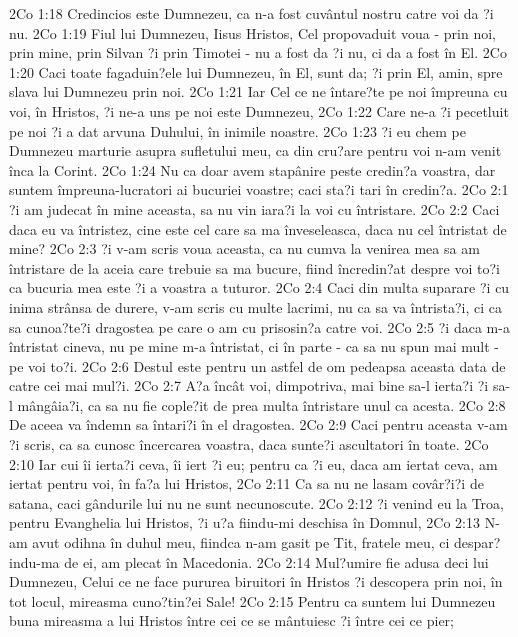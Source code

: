 2Co 1:18  Credincios este Dumnezeu, ca n-a fost cuvântul nostru catre voi da ?i nu.
2Co 1:19  Fiul lui Dumnezeu, Iisus Hristos, Cel propovaduit voua - prin noi, prin mine, prin Silvan ?i prin Timotei - nu a fost da ?i nu, ci da a fost în El.
2Co 1:20  Caci toate fagaduin?ele lui Dumnezeu, în El, sunt da; ?i prin El, amin, spre slava lui Dumnezeu prin noi.
2Co 1:21  Iar Cel ce ne întare?te pe noi împreuna cu voi, în Hristos, ?i ne-a uns pe noi este Dumnezeu,
2Co 1:22  Care ne-a ?i pecetluit pe noi ?i a dat arvuna Duhului, în inimile noastre.
2Co 1:23  ?i eu chem pe Dumnezeu marturie asupra sufletului meu, ca din cru?are pentru voi n-am venit înca la Corint.
2Co 1:24  Nu ca doar avem stapânire peste credin?a voastra, dar suntem împreuna-lucratori ai bucuriei voastre; caci sta?i tari în credin?a.
2Co 2:1  ?i am judecat în mine aceasta, sa nu vin iara?i la voi cu întristare.
2Co 2:2  Caci daca eu va întristez, cine este cel care sa ma înveseleasca, daca nu cel întristat de mine?
2Co 2:3  ?i v-am scris voua aceasta, ca nu cumva la venirea mea sa am întristare de la aceia care trebuie sa ma bucure, fiind încredin?at despre voi to?i ca bucuria mea este ?i a voastra a tuturor.
2Co 2:4  Caci din multa suparare ?i cu inima strânsa de durere, v-am scris cu multe lacrimi, nu ca sa va întrista?i, ci ca sa cunoa?te?i dragostea pe care o am cu prisosin?a catre voi.
2Co 2:5  ?i daca m-a întristat cineva, nu pe mine m-a întristat, ci în parte - ca sa nu spun mai mult - pe voi to?i.
2Co 2:6  Destul este pentru un astfel de om pedeapsa aceasta data de catre cei mai mul?i.
2Co 2:7  A?a încât voi, dimpotriva, mai bine sa-l ierta?i ?i sa-l mângâia?i, ca sa nu fie cople?it de prea multa întristare unul ca acesta.
2Co 2:8  De aceea va îndemn sa întari?i în el dragostea.
2Co 2:9  Caci pentru aceasta v-am ?i scris, ca sa cunosc încercarea voastra, daca sunte?i ascultatori în toate.
2Co 2:10  Iar cui îi ierta?i ceva, îi iert ?i eu; pentru ca ?i eu, daca am iertat ceva, am iertat pentru voi, în fa?a lui Hristos,
2Co 2:11  Ca sa nu ne lasam covâr?i?i de satana, caci gândurile lui nu ne sunt necunoscute.
2Co 2:12  ?i venind eu la Troa, pentru Evanghelia lui Hristos, ?i u?a fiindu-mi deschisa în Domnul,
2Co 2:13  N-am avut odihna în duhul meu, fiindca n-am gasit pe Tit, fratele meu, ci despar?indu-ma de ei, am plecat în Macedonia.
2Co 2:14  Mul?umire fie adusa deci lui Dumnezeu, Celui ce ne face pururea biruitori în Hristos ?i descopera prin noi, în tot locul, mireasma cuno?tin?ei Sale!
2Co 2:15  Pentru ca suntem lui Dumnezeu buna mireasma a lui Hristos între cei ce se mântuiesc ?i între cei ce pier;

